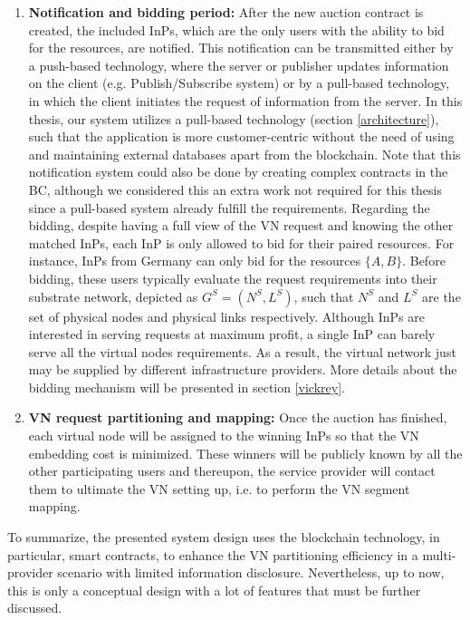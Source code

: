 \begin{enumerate}
 	\item \textbf{Notification and bidding period:} After the new auction contract is created, the included InPs, which are the only users with the ability to bid for the resources, are notified. This notification can be transmitted either by a push-based technology, where the server or publisher updates information on the client (e.g. Publish/Subscribe system) or by a pull-based technology, in which the client initiates the request of information from the server. In this thesis, our system utilizes a pull-based technology (section \ref{architecture}), such that the application is more customer-centric without the need of using and maintaining external databases apart from the blockchain. Note that this notification system could also be done by creating complex contracts in the BC, although we considered this an extra work not required for this thesis since a pull-based system already fulfill the requirements. Regarding the bidding, despite having a full view of the VN request and knowing the other matched InPs, each InP is only allowed to bid for their paired resources. For instance, InPs from Germany can only bid for the resources $\{A,B\}$. Before bidding, these users typically evaluate the request requirements into their substrate network, depicted as $G^{S} = (N^{S} , L^{S})$, such that $N^{S}$ and $L^{S}$ are the set of physical nodes and physical links respectively. Although InPs are interested in serving requests at maximum profit, a single InP can barely serve all the virtual nodes requirements. As a result, the virtual network just may be supplied by different infrastructure providers. More details about the bidding mechanism will be presented in section \ref{vickrey}.
 	\item \textbf{VN request partitioning and mapping:} Once the auction has finished, each virtual node will be assigned to the winning InPs so that the VN embedding cost is minimized. These winners will be publicly known by all the other participating users and thereupon, the service provider will contact them to ultimate the VN setting up, i.e. to perform the VN segment mapping.
\end{enumerate}

To summarize, the presented system design uses the blockchain technology, in particular, smart contracts, to enhance the VN partitioning efficiency in a multi-provider scenario with limited information disclosure. Nevertheless, up to now, this is only a conceptual design with a lot of features that must be further discussed.


